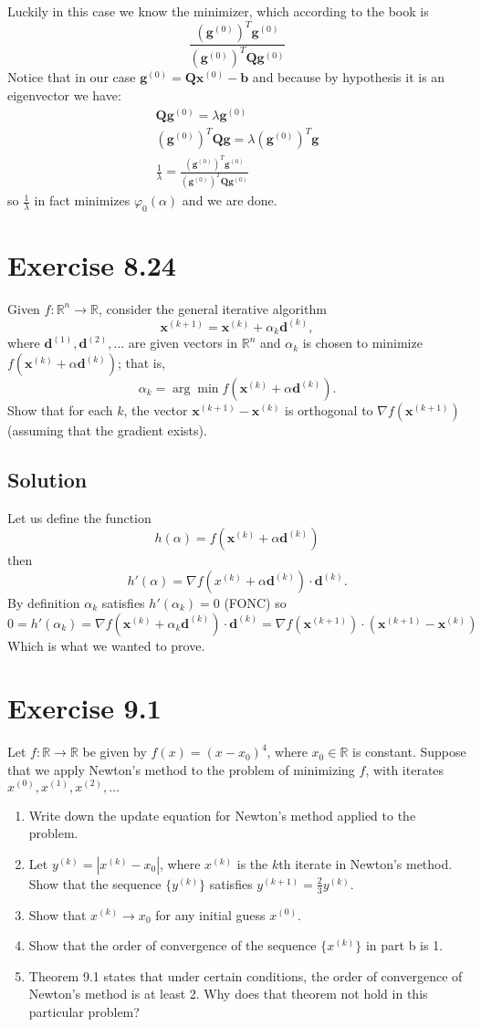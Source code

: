 \documentclass{article}
\newcommand{\bld}[1]{\boldsymbol{#1}}
\begin{document}
Luckily in this case we know the minimizer, which according to the
book is
\[
	\frac{(\bld{g}^{(0)})^T\bld{g}^{(0)}}{(\bld{g}^{(0)})^T\bld{Q}\bld{g}^{(0)}}
\]
Notice that in our case $\bld{g}^{(0)}=\bld{Q}\bld{x}^{(0)}-\bld{b}$ and
because by hypothesis it is an eigenvector we have:
\begin{align*}
	\bld{Q}\bld{g}^{(0)}=\lambda \bld{g}^{(0)}\\
	(\bld{g}^{(0)})^T\bld{Q}\bld{g}=\lambda (\bld{g}^{(0)})^T\bld{g}\\
	\frac{1}{\lambda}=\frac{(\bld{g}^{(0)})^T\bld{g}^{(0)}}{(\bld{g}^{(0)})^T\bld{Q}\bld{g}^{(0)}}
\end{align*}
so $\frac{1}{\lambda}$ in fact minimizes $\varphi_0(\alpha)$ and we are done.
\section*{Exercise 8.24}
Given $f:\mathbb{R}^n\to \mathbb{R}$, consider the general iterative algorithm
\[
	\bld{x}^{(k+1)}=\bld{x}^{(k)}+\alpha_k\bld{d}^{(k)},
\]
where $\bld{d}^{(1)},\bld{d}^{(2)},\dots$ are given vectors in $\mathbb{R}^n$
and $\alpha_k$ is chosen to minimize $f(\bld{x}^{(k)}+\alpha \bld{d}^{(k)})$;
that is,
\[
	\alpha_k = \arg \min f(\bld{x}^{(k)}+\alpha \bld{d}^{(k)}).
\]
Show that for each $k$, the vector $\bld{x}^{(k+1)}-\bld{x}^{(k)}$ is
orthogonal to $\nabla f(\bld{x}^{(k+1)})$ (assuming that the gradient exists).
\subsection*{Solution}
Let us define the function
\[
	h(\alpha)=f(\bld{x}^{(k)}+\alpha\bld{d}^{(k)})
\]
then
\[
	h'(\alpha)=\nabla f(x^{(k)}+\alpha \bld{d}^{(k)}) \cdot \bld{d}^{(k)}.
\]
By definition $\alpha_k$ satisfies $h'(\alpha_k)=0$ (FONC) so
\[
	0=h'(\alpha_k)=\nabla f(\bld{x}^{(k)}+\alpha_k \bld{d}^{(k)}) \cdot
	\bld{d}^{(k)} = \nabla f(\bld{x}^{(k+1)}) \cdot
	(\bld{x}^{(k+1)}-\bld{x}^{(k)})
\]
Which is what we wanted to prove.
\section*{Exercise 9.1}
Let $f:\mathbb{R} \to \mathbb{R}$ be given by $f(x) = (x-x_0)^4$, where $x_0\in \mathbb{R}$ is constant. Suppose that we apply Newton's method to the problem of minimizing $f$, with iterates $x^{(0)},x^{(1)},x^{(2)},\dots$
\begin{enumerate}[label=\alph*.]
\item Write down the update equation for Newton's method applied to the
problem.
\item Let $y^{(k)}=|x^{(k)}-x_0|$, where $x^{(k)}$ is the $k$th iterate in
	Newton's method. Show that the sequence $\{y^{(k)}\}$ satisfies
	$y^{(k+1)}=\frac{2}{3}y^{(k)}$.
\item Show that $x^{(k)}\to x_0$ for any initial guess $x^{(0)}$.
\item Show that the order of convergence of the sequence $\{x^{(k)}\}$ in part
	b is 1.
\item Theorem 9.1 states that under certain conditions, the order of
	convergence of Newton's method is at least 2. Why does that theorem not
	hold in this particular problem?
\end{enumerate}
\end{document}
